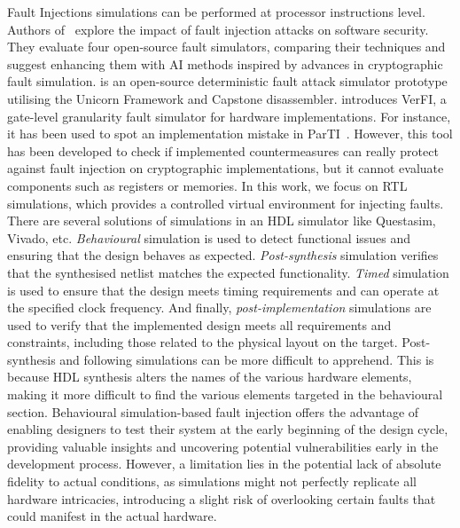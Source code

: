 Fault Injections simulations can be performed at processor instructions level. Authors of~\cite{AB-23-acns} explore the impact of fault injection attacks on software security. They evaluate four open-source fault simulators, comparing their techniques and suggest enhancing them with AI methods inspired by advances in cryptographic fault simulation. \cite{fisim} is an open-source deterministic fault attack simulator prototype utilising the Unicorn Framework and Capstone disassembler.
\cite{AWMN-20-host} introduces VerFI, a gate-level granularity fault simulator for hardware implementations. For instance, it has been used to spot an implementation mistake in ParTI~\cite{SMG-16-crypto}.
However, this tool has been developed to check if implemented countermeasures can really protect against fault injection on cryptographic implementations, but it cannot evaluate components such as registers or memories.
In this work, we focus on RTL simulations, which provides a controlled virtual environment for injecting faults. There are several solutions of simulations in an HDL simulator like Questasim, Vivado, etc. \textit{Behavioural} simulation is used to detect functional issues and ensuring that the design behaves as expected. \textit{Post-synthesis} simulation verifies that the synthesised netlist matches the expected functionality. \textit{Timed} simulation is used to ensure that the design meets timing requirements and can operate at the specified clock frequency. And finally, \textit{post-implementation} simulations are used to verify that the implemented design meets all requirements and constraints, including those related to the physical layout on the target.
Post-synthesis and following simulations can be more difficult to apprehend. This is because HDL synthesis alters the names of the various hardware elements, making it more difficult to find the various elements targeted in the behavioural section.
Behavioural simulation-based fault injection offers the advantage of enabling designers to test their system at the early beginning of the design cycle, providing valuable insights and uncovering potential vulnerabilities early in the development process. However, a limitation lies in the potential lack of absolute fidelity to actual conditions, as simulations might not perfectly replicate all hardware intricacies, introducing a slight risk of overlooking certain faults that could manifest in the actual hardware.


